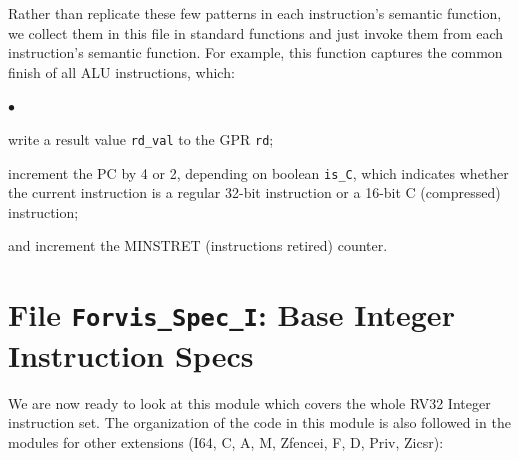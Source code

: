 \documentclass[11pt]{article}
\newenvironment{tightlist}%
{\begin{list}{$\bullet$}{%
    \setlength{\topsep}{0in}
    \setlength{\partopsep}{0in}
    \setlength{\itemsep}{0in}
    \setlength{\parsep}{0in}
    \setlength{\leftmargin}{1.5em}
    \setlength{\rightmargin}{0in}
    \setlength{\itemindent}{0in}
}
}%
{\end{list}
}
\begin{document}
Rather than replicate these few patterns in each instruction's
semantic function, we collect them in this file in standard functions
and just invoke them from each instruction's semantic function.  For
example, this function captures the common finish of all ALU
instructions, which:

\begin{tightlist}

\item write a result value \verb|rd_val| to the GPR \verb|rd|;

\item increment the PC by 4 or 2, depending on boolean \verb|is_C|,
which indicates whether the current instruction is a regular 32-bit
instruction or a 16-bit C (compressed) instruction;

\item and increment the MINSTRET (instructions retired) counter.

\end{tightlist}




\section{File {\tt Forvis\_Spec\_I}: Base Integer Instruction Specs}

\label{sec_ISA_spec_I}

We are now ready to look at this module which covers the whole RV32
Integer instruction set.  The organization of the code in this module
is also followed in the modules for other extensions (I64, C, A, M,
Zfencei, F, D, Priv, Zicsr):
\end{document}
